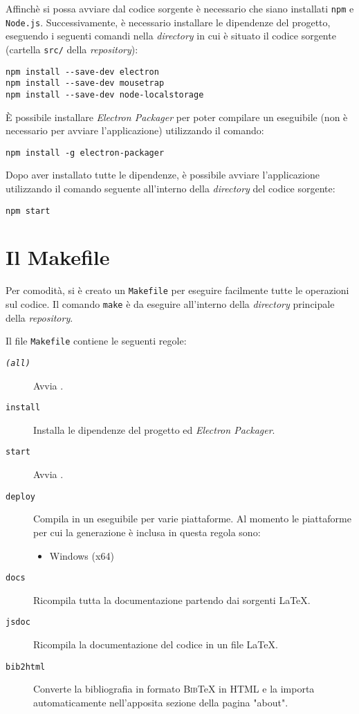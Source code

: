 Affinchè si possa avviare \ProjectTitle{} dal codice sorgente è necessario che siano installati \texttt{npm} e \texttt{Node.js}. Successivamente, è necessario installare le dipendenze del progetto, eseguendo i seguenti comandi nella \textit{directory} in cui è situato il codice sorgente (cartella \texttt{src/} della \textit{repository}):

\begin{lstlisting}
npm install --save-dev electron
npm install --save-dev mousetrap
npm install --save-dev node-localstorage
\end{lstlisting}

È possibile installare \textit{Electron Packager} per poter compilare un eseguibile (non è necessario per avviare l'applicazione) utilizzando il comando:

\begin{lstlisting}
npm install -g electron-packager
\end{lstlisting}

Dopo aver installato tutte le dipendenze, è possibile avviare l'applicazione utilizzando il comando seguente all'interno della \textit{directory} del codice sorgente:

\begin{lstlisting}
npm start
\end{lstlisting}

\section{Il Makefile}

Per comodità, si è creato un \texttt{Makefile} per eseguire facilmente tutte le operazioni sul codice. Il comando \lstinline|make| è da eseguire all'interno della \textit{directory} principale della \textit{repository}.

Il file \texttt{Makefile} contiene le seguenti regole:
\begin{description}
	\item[\texttt{\textit{(all)}}] Avvia \ProjectTitle{}.
	\item[\texttt{install}] Installa le dipendenze del progetto ed \textit{Electron Packager}.
	\item[\texttt{start}] Avvia \ProjectTitle{}.
	\item[\texttt{deploy}] Compila \ProjectTitle{} in un eseguibile per varie piattaforme. Al momento le piattaforme per cui la generazione è inclusa in questa regola sono:
	\begin{itemize}
		\item Windows (x64)
	\end{itemize}
	\item[\texttt{docs}] Ricompila tutta la documentazione partendo dai sorgenti \LaTeX.
	\item[\texttt{jsdoc}] Ricompila la documentazione del codice in un file \LaTeX.
	\item[\texttt{bib2html}] Converte la bibliografia in formato \textsc{Bib}\TeX{} in HTML e la importa automaticamente nell'apposita sezione della pagina "about".
\end{description}